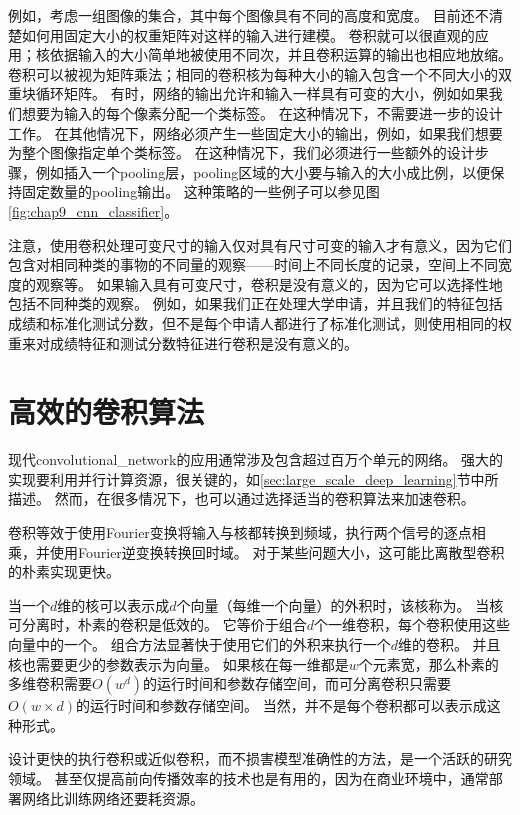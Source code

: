 例如，考虑一组图像的集合，其中每个图像具有不同的高度和宽度。
目前还不清楚如何用固定大小的权重矩阵对这样的输入进行建模。
卷积就可以很直观的应用；核依据输入的大小简单地被使用不同次，并且卷积运算的输出也相应地放缩。
卷积可以被视为矩阵乘法；相同的卷积核为每种大小的输入包含一个不同大小的双重块循环矩阵。
有时，网络的输出允许和输入一样具有可变的大小，例如如果我们想要为输入的每个像素分配一个类标签。
在这种情况下，不需要进一步的设计工作。
在其他情况下，网络必须产生一些固定大小的输出，例如，如果我们想要为整个图像指定单个类标签。
在这种情况下，我们必须进行一些额外的设计步骤，例如插入一个\gls{pooling}层，\gls{pooling}区域的大小要与输入的大小成比例，以便保持固定数量的\gls{pooling}输出。
这种策略的一些例子可以参见图\ref{fig:chap9_cnn_classifier}。

注意，使用卷积处理可变尺寸的输入仅对具有尺寸可变的输入才有意义，因为它们包含对相同种类的事物的不同量的观察——时间上不同长度的记录，空间上不同宽度的观察等。
如果输入具有可变尺寸，卷积是没有意义的，因为它可以选择性地包括不同种类的观察。
例如，如果我们正在处理大学申请，并且我们的特征包括成绩和标准化测试分数，但不是每个申请人都进行了标准化测试，则使用相同的权重来对成绩特征和测试分数特征进行卷积是没有意义的。

\section{高效的卷积算法}
\label{sec:efficient_convolution_algorithms}

现代\gls{convolutional_network}的应用通常涉及包含超过百万个单元的网络。
强大的实现要利用并行计算资源，很关键的，如\ref{sec:large_scale_deep_learning}节中所描述。
然而，在很多情况下，也可以通过选择适当的卷积算法来加速卷积。
 
 
卷积等效于使用Fourier变换将输入与核都转换到频域，执行两个信号的逐点相乘，并使用Fourier逆变换转换回时域。
对于某些问题大小，这可能比离散型卷积的朴素实现更快。

当一个$d$维的核可以表示成$d$个向量（每维一个向量）的外积时，该核称为。
当核可分离时，朴素的卷积是低效的。
它等价于组合$d$个一维卷积，每个卷积使用这些向量中的一个。
组合方法显著快于使用它们的外积来执行一个$d$维的卷积。
并且核也需要更少的参数表示为向量。
如果核在每一维都是$w$个元素宽，那么朴素的多维卷积需要$O(w^d)$的运行时间和参数存储空间，而可分离卷积只需要$O(w\times d)$的运行时间和参数存储空间。
当然，并不是每个卷积都可以表示成这种形式。

设计更快的执行卷积或近似卷积，而不损害模型准确性的方法，是一个活跃的研究领域。 
甚至仅提高前向传播效率的技术也是有用的，因为在商业环境中，通常部署网络比训练网络还要耗资源。

